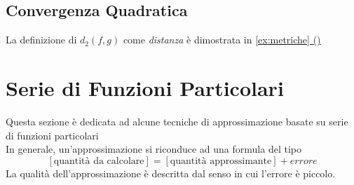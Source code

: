 \subsection{Convergenza Quadratica}\label{sect:conv_quadr}
\begin{proposition}
	\label{def:dist_quadratica}

	La definizione di $d_2(f,g)$ come \textit{distanza} è dimostrata in \hyperref[ex:dim_dist_quadratica]{\cref*{ex:metriche} ()}
\end{proposition}
\begin{proposition}
	\label{prop:dist_quad_sp_metr_non_compl}
\end{proposition}

\newpage
\section{Serie di Funzioni Particolari}\label{sect:ser_funz_particol}
Questa sezione è dedicata ad alcune tecniche di approssimazione  basate su serie di funzioni particolari\\
In generale, un'approssimazione si riconduce ad una formula del tipo
\[\left[\text{quantità da calcolare}\right]=\left[\text{quantità approssimante}\right]+ errore\]
La qualità dell'approssimazione è descritta dal senso in cui l'errore è piccolo.

